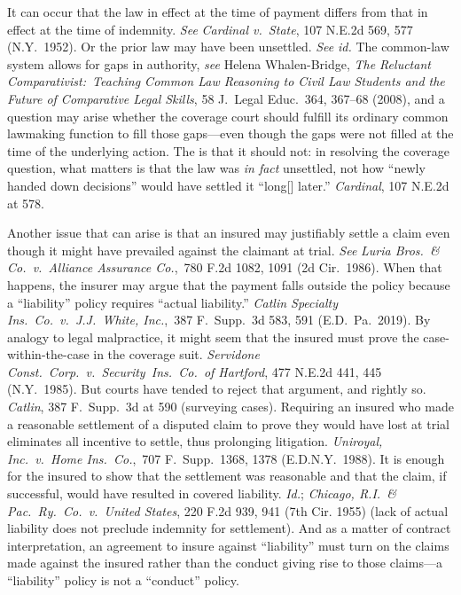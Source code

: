 \documentclass[
  12pt,
  letterpaper,
]{scrartcl}
\begin{document}
It can occur that the law in effect at the time of payment differs from that in
effect at the time of indemnity. \textit{See} \textit{Cardinal v.~State}, 107
N.E.2d 569, 577 (N.Y.~1952). Or the prior law may have been unsettled.
\textit{See} \textit{id.} The common-law system allows for gaps in authority,
\textit{see} Helena Whalen-Bridge, \textit{The Reluctant
Comparativist:~Teaching Common Law Reasoning to Civil Law Students and the
Future of Comparative Legal Skills}, 58 J.~Legal Educ.~364, 367--68 (2008), and
a question may arise whether the coverage court should fulfill its ordinary common
lawmaking function to fill those gaps---even though the gaps were not filled at the time of the underlying action. The is that it should not: in resolving the coverage question, what matters is
that the law was \textit{in fact} unsettled, not how ``newly handed down decisions''
would have settled it ``long[] later.'' \textit{Cardinal}, 107 N.E.2d at
578.

Another issue that can arise is that an insured may justifiably settle a claim
even though it might have prevailed against the claimant at trial. \textit{See}
\textit{Luria Bros.~\& Co.~v.~Alliance Assurance Co.},~780 F.2d 1082, 1091 (2d
Cir.~1986). When that happens, the insurer may argue that the payment falls
outside the policy because a ``liability'' policy requires ``actual
liability.'' \textit{Catlin Specialty Ins.~Co.~v.~J.J.~White, Inc.},~387
F.~Supp.~3d 583, 591 (E.D.~Pa.~2019). By analogy to legal
malpractice, it might seem that the insured must prove the case-within-the-case
in the coverage suit. \textit{Servidone Const.~Corp.~v.~Security~Ins.~Co.~of
Hartford}, 477 N.E.2d 441, 445 (N.Y.~1985). But courts have tended to reject
that argument, and rightly so. \textit{Catlin}, 387 F.~Supp.~3d at 590 (surveying cases).
Requiring an insured who made a reasonable settlement of a disputed claim to prove
they would have lost at trial eliminates all incentive to settle, thus prolonging
litigation. \textit{Uniroyal, Inc.~v.~Home Ins.~Co.},~707 F.~Supp.~1368,
1378 (E.D.N.Y.~1988). It is enough for the insured to show that the settlement was
reasonable and that the claim, if successful, would have resulted in covered liability. \textit{Id.}; \textit{Chicago, R.I.~\&
Pac.~Ry.~Co.~v.~United States}, 220 F.2d 939, 941 (7th Cir. 1955) (lack of
actual liability does not preclude indemnity for settlement). And as a matter of contract interpretation, an agreement to insure against ``liability'' must turn on the claims made
against the insured rather than the conduct giving rise to those claims---a ``liability'' policy is not a ``conduct'' policy.
\end{document}

